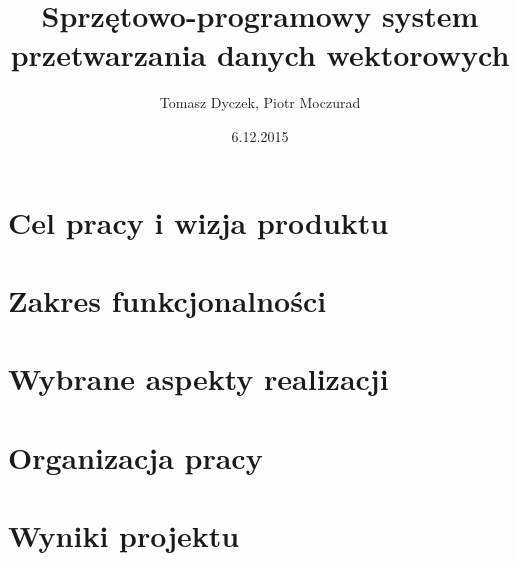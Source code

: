 \documentclass[12pt,twoside]{report}
\title{Sprzętowo-programowy system przetwarzania danych wektorowych}
\author{Tomasz Dyczek, Piotr Moczurad}
\date{6.12.2015}
\begin{document}
	
	
	\tableofcontents
	
	\chapter{Cel pracy i wizja produktu}
    

    \chapter{Zakres funkcjonalności}
    

    \chapter{Wybrane aspekty realizacji}
    

    \chapter{Organizacja pracy}
    

    \chapter{Wyniki projektu}
    

    
	
\end{document}
